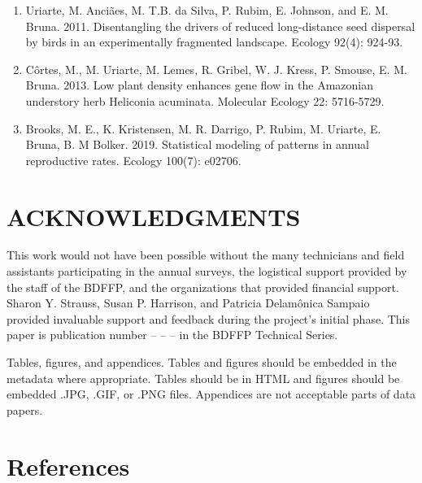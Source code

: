\documentclass[
  english,
  man]{apa6}
\begin{document}
\begin{enumerate}
\item
  Uriarte, M. Anciães, M. T.B. da Silva, P. Rubim, E. Johnson, and E.
  M. Bruna. 2011. Disentangling the drivers of reduced long-distance
  seed dispersal by birds in an experimentally fragmented landscape.
  Ecology 92(4): 924-93.
\item
  Côrtes, M., M. Uriarte, M. Lemes, R. Gribel, W. J. Kress, P.
  Smouse, E. M. Bruna. 2013. Low plant density enhances gene flow in
  the Amazonian understory herb Heliconia acuminata. Molecular Ecology
  22: 5716-5729.
\item
  Brooks, M. E., K. Kristensen, M. R. Darrigo, P. Rubim, M.
  Uriarte, E. Bruna, B. M Bolker. 2019. Statistical modeling of
  patterns in annual reproductive rates. Ecology 100(7): e02706.
\end{enumerate}

\hypertarget{acknowledgments}{%
\section{ACKNOWLEDGMENTS}\label{acknowledgments}}

This work would not have been possible without the many technicians and
field assistants participating in the annual surveys, the logistical
support provided by the staff of the BDFFP, and the organizations that
provided financial support. Sharon Y. Strauss, Susan P. Harrison, and
Patricia Delamônica Sampaio provided invaluable support and feedback
during the project's initial phase. This paper is publication number --
-- -- in the BDFFP Technical Series.

Tables, figures, and appendices. Tables and figures should be embedded
in the metadata where appropriate. Tables should be in HTML and figures
should be embedded .JPG, .GIF, or .PNG files. Appendices are not
acceptable parts of data papers.

\newpage

\hypertarget{references}{%
\section{References}\label{references}}

\begingroup
\setlength{\parindent}{-0.5in}
\setlength{\leftskip}{0.5in}
\end{document}
